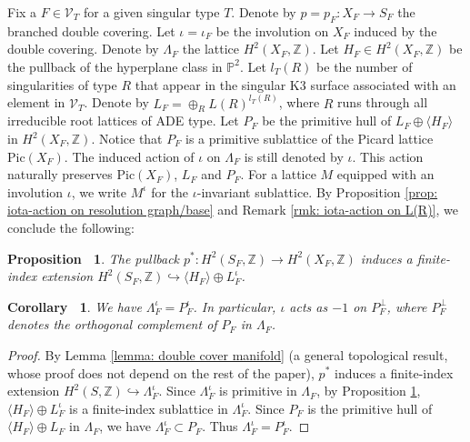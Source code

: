 \documentclass[12pt,reqno,a4paper]{amsart}
\newtheorem{prop}[thm]{Proposition~}
\newtheorem{cor}[thm]{Corollary~}
\theoremstyle{remark}
\theoremstyle{definition}
\newcommand{\ZZ}{\mathbb{Z}}
\newcommand{\PP}{\mathbb{P}}
\newcommand{\calV}{\mathcal{V}}
\newcommand{\Pic}{\mathrm{Pic}}
\begin{document}
Fix a $F\in \calV_{T}$ for a given singular type $T$. 
Denote by $p=p_F\colon X_F\to S_F$ the branched double covering.
Let $\iota=\iota_F$ be the involution on $X_F$ induced by the double covering.
Denote by $\Lambda_F$ the lattice $H^2(X_F, \ZZ)$. 
Let $H_F\in H^2(X_F, \ZZ)$ be the pullback of the hyperplane class in $\PP^2$.
Let $l_{T}(R)$ be the number of singularities of type $R$ that appear in the singular K3 surface associated with an element in $\calV_{T}$.
Denote by $L_F=\oplus_R L(R)^{l_{T}(R)}$, where $R$ runs through all irreducible root lattices of ADE type. Let $P_F$ be the primitive hull of $L_F\oplus \langle H_F\rangle$ in $H^2(X_F,\ZZ)$. 
Notice that $P_F$ is a primitive sublattice of the Picard lattice $\Pic(X_F)$. The induced action of $\iota$ on $\Lambda_F$ is still denoted by $\iota$. This action naturally preserves $\Pic(X_F)$, $L_F$ and $P_F$.
For a lattice $M$ equipped with an involution $\iota$, we write $M^{\iota}$ for the $\iota$-invariant sublattice.
By Proposition \ref{prop: iota-action on resolution graph/base} and Remark \ref{rmk: iota-action on L(R)}, we conclude the following:
\begin{prop}
\label{prop: finite index H^2(S) to H oplus L^iota}
    The pullback $p^*\colon H^2(S_F,\ZZ)\to H^2(X_F,\ZZ)$ induces a finite-index extension $H^2(S_F,\ZZ)\hookrightarrow \langle H_F \rangle\oplus L_F^{\iota}$. 
\end{prop}
\begin{cor}
\label{cor: Lambda_F^iota = P_F^iota}
    We have $\Lambda_F^\iota = P_F^\iota$.
    In particular, $\iota$ acts as $-1$ on $P_F^\perp$, where $P_F^\perp$ denotes the orthogonal complement of $P_F$ in $\Lambda_F$. 
\end{cor}
\begin{proof}
    By Lemma \ref{lemma: double cover manifold} (a general topological result, whose proof does not depend on the rest of the paper), $p^*$ induces a finite-index extension $H^2(S,\ZZ)\hookrightarrow \Lambda_F^\iota$.
    Since $\Lambda_F^\iota$ is primitive in $\Lambda_F$, by Proposition \ref{prop: finite index H^2(S) to H oplus L^iota}, $\langle H_F \rangle\oplus L_F^{\iota}$ is a finite-index sublattice in $\Lambda_F^\iota$.
    Since $P_F$ is the primitive hull of $\langle H_F \rangle\oplus L_F$ in $\Lambda_F$, we have $\Lambda_F^\iota\subset P_F$.
    Thus $\Lambda_F^\iota = P_F^\iota$.
\end{proof}
\end{document}
